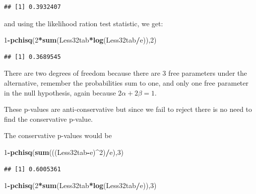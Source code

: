 \documentclass[]{book}
\newenvironment{Shaded}{\begin{snugshade}}{\end{snugshade}}
\newcommand{\KeywordTok}[1]{\textcolor[rgb]{0.13,0.29,0.53}{\textbf{#1}}}
\newcommand{\DecValTok}[1]{\textcolor[rgb]{0.00,0.00,0.81}{#1}}
\newcommand{\OperatorTok}[1]{\textcolor[rgb]{0.81,0.36,0.00}{\textbf{#1}}}
\newcommand{\NormalTok}[1]{#1}
\theoremstyle{definition}
\theoremstyle{definition}
\theoremstyle{definition}
\theoremstyle{remark}
\begin{document}
\begin{verbatim}
## [1] 0.3932407
\end{verbatim}

and using the likelihood ration test statistic, we get:

\begin{Shaded}
\begin{Highlighting}[]
\DecValTok{1}\OperatorTok{-}\KeywordTok{pchisq}\NormalTok{(}\DecValTok{2}\OperatorTok{*}\KeywordTok{sum}\NormalTok{(Less32tab}\OperatorTok{*}\KeywordTok{log}\NormalTok{(Less32tab}\OperatorTok{/}\NormalTok{e)),}\DecValTok{2}\NormalTok{)}
\end{Highlighting}
\end{Shaded}

\begin{verbatim}
## [1] 0.3689545
\end{verbatim}

There are two degrees of freedom because there are 3 free parameters
under the alternative, remember the probabilities sum to one, and only
one free parameter in the null hypothesis, again because
\(2 \alpha + 2 \beta = 1\).

These p-values are anti-conservative but since we fail to reject there
is no need to find the conservative p-value.

The conservative p-values would be

\begin{Shaded}
\begin{Highlighting}[]
\DecValTok{1}\OperatorTok{-}\KeywordTok{pchisq}\NormalTok{(}\KeywordTok{sum}\NormalTok{(((Less32tab}\OperatorTok{-}\NormalTok{e)}\OperatorTok{^}\DecValTok{2}\NormalTok{)}\OperatorTok{/}\NormalTok{e),}\DecValTok{3}\NormalTok{)}
\end{Highlighting}
\end{Shaded}

\begin{verbatim}
## [1] 0.6005361
\end{verbatim}

\begin{Shaded}
\begin{Highlighting}[]
\DecValTok{1}\OperatorTok{-}\KeywordTok{pchisq}\NormalTok{(}\DecValTok{2}\OperatorTok{*}\KeywordTok{sum}\NormalTok{(Less32tab}\OperatorTok{*}\KeywordTok{log}\NormalTok{(Less32tab}\OperatorTok{/}\NormalTok{e)),}\DecValTok{3}\NormalTok{)}
\end{Highlighting}
\end{Shaded}
\end{document}
